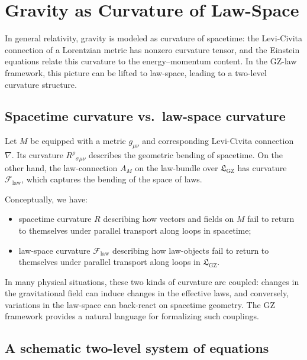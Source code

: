 \documentclass[11pt]{book}
\newcommand{\GZLS}{\ensuremath{\mathfrak{L}_{\mathrm{GZ}}}}
\newcommand{\GZLOC}{\ensuremath{A_M}}
\newcommand{\GZLCurv}{\ensuremath{\mathcal{F}_{\mathrm{law}}}}
\newcommand{\Base}{\ensuremath{M}}
\theoremstyle{plain}
\theoremstyle{definition}
\theoremstyle{remark}
\begin{document}
\section{Gravity as Curvature of Law-Space}
\label{sec:gravity-as-law-curv}



In general relativity, gravity is modeled as curvature of spacetime:
the Levi-Civita connection of a Lorentzian metric has nonzero curvature
tensor, and the Einstein equations relate this curvature to the
energy--momentum content. In the GZ-law framework, this picture can be
lifted to law-space, leading to a two-level curvature structure.

\subsection{Spacetime curvature vs.~law-space curvature}

Let $\Base$ be equipped with a metric $g_{\mu\nu}$ and corresponding
Levi-Civita connection $\nabla$. Its curvature
$R^\rho{}_{\sigma\mu\nu}$ describes the geometric bending of
spacetime. On the other hand, the law-connection $\GZLOC$ on the
law-bundle over $\GZLS$ has curvature $\GZLCurv$, which captures the
bending of the space of laws.

Conceptually, we have:
\begin{itemize}
  \item spacetime curvature $R$ describing how vectors and fields on
        $\Base$ fail to return to themselves under parallel transport
        along loops in spacetime;
  \item law-space curvature $\GZLCurv$ describing how law-objects fail
        to return to themselves under parallel transport along loops in
        $\GZLS$.
\end{itemize}

In many physical situations, these two kinds of curvature are coupled:
changes in the gravitational field can induce changes in the effective
laws, and conversely, variations in the law-space can back-react on
spacetime geometry. The GZ framework provides a natural language for
formalizing such couplings.

\subsection{A schematic two-level system of equations}
\end{document}

